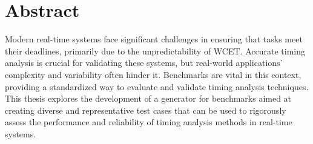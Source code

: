 \thispagestyle{plain}
\section*{Abstract}
Modern real-time systems face significant challenges in ensuring that tasks meet their deadlines, primarily due to the unpredictability of \ac{WCET}. 
Accurate timing analysis is crucial for validating these systems, but real-world applications' complexity and variability often hinder it. 
Benchmarks are vital in this context, providing a standardized way to evaluate and validate timing analysis techniques. 
This thesis explores the development of a generator for benchmarks aimed at creating diverse and representative test cases that can be used to rigorously assess the performance and reliability of timing analysis methods in real-time systems.